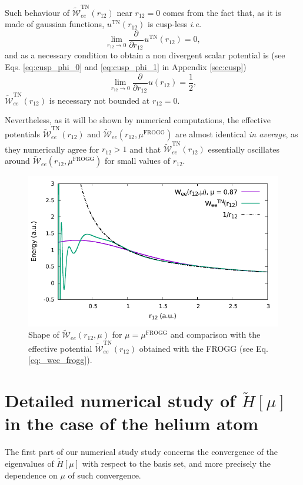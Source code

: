 \documentclass[aip,jcp,reprint,noshowkeys,superscriptaddress,twocolumn]{revtex4-1}
\newcommand{\deriv}[3]{\frac{\partial^{#3} #1}{\partial {#2}^{#3}}}
\newcommand{\mfrogg}[0]{\mu^\text{FROGG}}
\begin{document}
Such behaviour of $\tilde{\mathcal{W}}_{ee}^\text{TN}(r_{12})$ near $r_{12}=0$ comes from the fact that,
as it is made of gaussian functions, $u^{\text{TN}}(r_{12})$ is cusp-less \textit{i.e.} 
\begin{equation}
 \lim_{r_{12}\rightarrow 0} \deriv{}{r_{12}}{}u^{\text{TN}}(r_{12}) = 0, 
\end{equation}
and as a necessary condition to obtain a non divergent scalar potential is (see Eqs. \eqref{eq:cusp_phi_0}  and \eqref{eq:cusp_phi_1} in Appendix \ref{sec:cusp}) 
\begin{equation}
 \label{eq:cusp_phi_0}
 \lim_{r_{12}\rightarrow 0} \deriv{}{r_{12}}{}u(r_{12}) = \frac{1}{2}, 
\end{equation}
$\tilde{\mathcal{W}}_{ee}^\text{TN}(r_{12})$ is necessary not bounded at $r_{12}=0$.  

Nevertheless, as it will be shown by numerical computations, the effective potentials $\tilde{\mathcal{W}}_{ee}^\text{TN}(r_{12})$ and $\tilde{\mathcal{W}}_{ee}(r_{12},\mfrogg)$ are almost identical \textit{in average}, as they numerically agree for $r_{12}>1$ and that $\tilde{\mathcal{W}}_{ee}^\text{TN}(r_{12})$ essentially oscillates around $\tilde{\mathcal{W}}_{ee}(r_{12},\mfrogg)$ for small values of $r_{12}$. 

\begin{figure}
        \includegraphics[width=0.45\linewidth]{plots/jastrow/w_ee_frog.pdf}
        \caption{Shape of $\tilde{\mathcal{W}}_{ee}(r_{12},\mu)$ for $\mu=\mfrogg$ and comparison with the effective potential $\tilde{\mathcal{W}}_{ee}^\text{TN}(r_{12})$ obtained with the FROGG (see Eq. \eqref{eq:_wee_frogg}).}
 \label{fig_wee_frogg}
\end{figure}

\section{Detailed numerical study of $\tilde{H}[\mu]$ in the case of the helium atom}
\label{sec:total_he}
The first part of our numerical study study concerns the convergence of the eigenvalues of $\tilde{H}[\mu]$ with respect to the basis set, and more precisely the dependence on $\mu$ of such convergence. 
\end{document}
